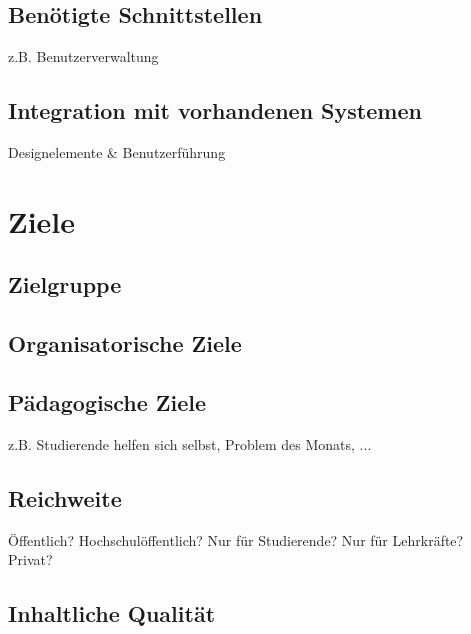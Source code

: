 
\subsection{Benötigte Schnittstellen} %
\label{sub:benotigte_schnittstellen}
z.B. Benutzerverwaltung

\subsection{Integration mit vorhandenen Systemen} %
\label{sub:integration_mit_vorhandenen_systemen}
Designelemente \& Benutzerführung


\section{Ziele} %
\label{sec:ziele}

\subsection{Zielgruppe} %
\label{sub:zielgruppe}


\subsection{Organisatorische Ziele} %
\label{sub:organisatorische_ziele}


\subsection{Pädagogische Ziele} %
\label{sub:padagogische_ziele}
z.B. Studierende helfen sich selbst, Problem des Monats, ...

\subsection{Reichweite} %
\label{sub:reichweite}
Öffentlich? Hochschulöffentlich? Nur für Studierende? Nur für Lehrkräfte? Privat?

\subsection{Inhaltliche Qualität} %
\label{sub:inhaltliche_qualitat}

